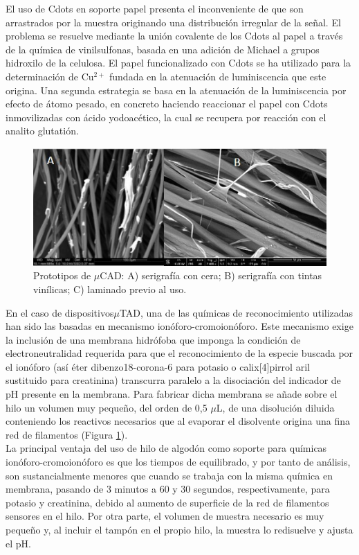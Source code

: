 \documentclass{article}
\begin{document}
El uso de Cdots en soporte papel presenta el inconveniente de que son arrastrados por la muestra originando una distribución irregular de la señal. El problema se resuelve mediante la unión covalente de los Cdots al papel a través de la química de vinilsulfonas, basada en una adición de Michael a grupos hidroxilo de la celulosa. El papel funcionalizado con Cdots se ha utilizado para la determinación de Cu$^{2+}$ fundada en la atenuación de luminiscencia que este origina. Una segunda estrategia se basa en la atenuación de la luminiscencia por efecto de átomo pesado, en concreto haciendo reaccionar el papel con Cdots inmovilizadas con ácido yodoacético, la cual se recupera por reacción con el analito glutatión.

\begin{figure}[h]
	\includegraphics[width=\textwidth]{micro}
	\caption{Prototipos de $\mu$CAD: A) serigrafía con cera; B) serigrafía con tintas vinílicas; C) laminado previo al uso.}
	\label{fig:micro}
\end{figure}

En el caso de dispositivos$\mu$TAD, una de las químicas de reconocimiento utilizadas han sido las basadas en mecanismo ionóforo-cromoionóforo. Este mecanismo exige la inclusión de una membrana hidrófoba que imponga la condición de electroneutralidad requerida para que el reconocimiento de la especie buscada por el ionóforo (así éter dibenzo18-corona-6 para potasio\cite{Erenas2016} o calix[4]pirrol aril sustituido para creatinina) transcurra paralelo a la disociación del indicador de pH presente en la membrana. Para fabricar dicha membrana se añade sobre el hilo un volumen muy pequeño, del orden de 0,5 $\mu$L, de una disolución diluida conteniendo los reactivos necesarios que al evaporar el disolvente origina una fina red de filamentos (Figura \ref{fig:micro}).\\

La principal ventaja del uso de hilo de algodón como soporte para químicas ionóforo-cromoionóforo es que los tiempos de equilibrado, y por tanto de análisis, son sustancialmente menores que cuando se trabaja con la misma química en membrana, pasando de 3 minutos a 60 y 30 segundos, respectivamente, para potasio y creatinina, debido al aumento de superficie de la red de filamentos sensores en el hilo. Por otra parte, el volumen de muestra necesario es muy pequeño y, al incluir el tampón en el propio hilo, la muestra lo redisuelve y ajusta el pH. \\
\end{document}

